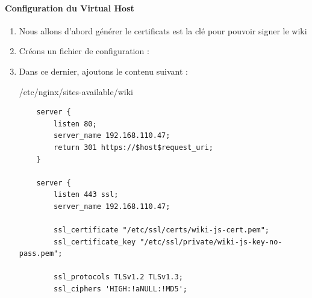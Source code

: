 \documentclass{article}
\begin{document}
\paragraph{Configuration du Virtual Host\\}

\begin{enumerate}
	\item Nous allons d'abord générer le certificats est la clé pour pouvoir signer le wiki
	\item Créons un fichier de configuration :
	\item Dans ce dernier, ajoutons le contenu suivant :
\begin{configbox}{/etc/nginx/sites-available/wiki}
\begin{lstlisting}
	server {
		listen 80;
		server_name 192.168.110.47;
		return 301 https://$host$request_uri;
	}
	
	server {
		listen 443 ssl;
		server_name 192.168.110.47;
	
		ssl_certificate "/etc/ssl/certs/wiki-js-cert.pem";
		ssl_certificate_key "/etc/ssl/private/wiki-js-key-no-pass.pem";
	
		ssl_protocols TLSv1.2 TLSv1.3;
		ssl_ciphers 'HIGH:!aNULL:!MD5';
	

\end{lstlisting}
\end{configbox}
\end{enumerate}
\end{document}
